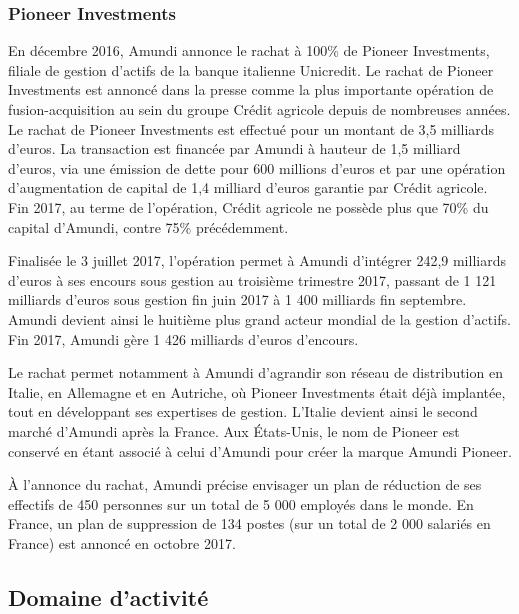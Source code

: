 \subsubsection{Pioneer Investments}
\par En décembre 2016, Amundi annonce le rachat à 100\% de Pioneer Investments, filiale de gestion d'actifs de la banque italienne Unicredit. Le rachat de Pioneer Investments est annoncé dans la presse comme la plus importante opération de fusion-acquisition au sein du groupe Crédit agricole depuis de nombreuses années. Le rachat de Pioneer Investments est effectué pour un montant de 3,5 milliards d'euros. La transaction est financée par Amundi à hauteur de 1,5 milliard d'euros, via une émission de dette pour 600 millions d'euros et par une opération d'augmentation de capital de 1,4 milliard d'euros garantie par Crédit agricole. Fin 2017, au terme de l'opération, Crédit agricole ne possède plus que 70\% du capital d'Amundi, contre 75\% précédemment.
\par Finalisée le 3 juillet 2017, l'opération permet à Amundi d'intégrer 242,9 milliards d'euros à ses encours sous gestion au troisième trimestre 2017, passant de 1 121 milliards d'euros sous gestion fin juin 2017 à 1 400 milliards fin septembre. Amundi devient ainsi le huitième plus grand acteur mondial de la gestion d'actifs. Fin 2017, Amundi gère 1 426 milliards d'euros d'encours.
\par Le rachat permet notamment à Amundi d'agrandir son réseau de distribution en Italie, en Allemagne et en Autriche, où Pioneer Investments était déjà implantée, tout en développant ses expertises de gestion. L'Italie devient ainsi le second marché d'Amundi après la France. Aux États-Unis, le nom de Pioneer est conservé en étant associé à celui d'Amundi pour créer la marque Amundi Pioneer.
\par À l'annonce du rachat, Amundi précise envisager un plan de réduction de ses effectifs de 450 personnes sur un total de 5 000 employés dans le monde. En France, un plan de suppression de 134 postes (sur un total de 2 000 salariés en France) est annoncé en octobre 2017.


\subsection{Domaine d'activité}

